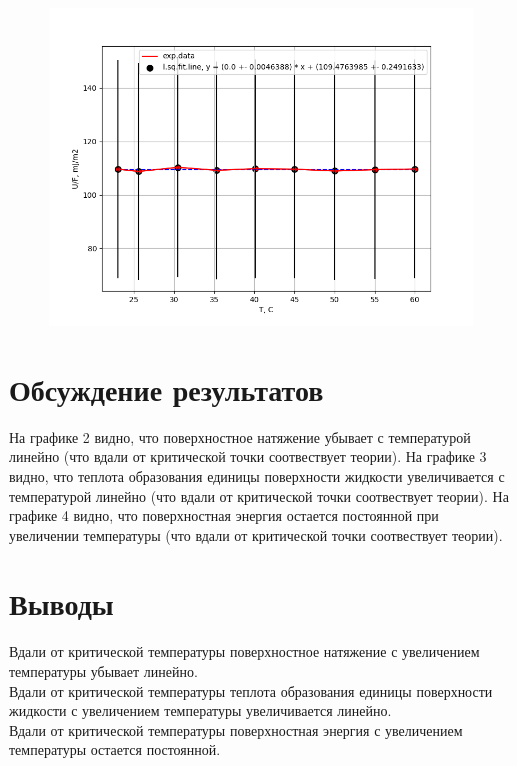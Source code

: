 \documentclass[a4paper,12pt]{article} %
\begin{document}
\begin{figure}[h!]
\begin{floatrow}
         {\includegraphics[scale=0.65]{physlabwork_13week_dUFdT.png}}     
\end{floatrow}
\end{figure}

\section{Обсуждение результатов}
На графике 2 видно, что поверхностное натяжение убывает с температурой линейно (что вдали от критической точки соотвествует теории). На графике 3 видно, что теплота образования единицы поверхности жидкости увеличивается с температурой линейно (что вдали от критической точки соотвествует теории). На графике 4 видно, что поверхностная энергия остается постоянной при увеличении температуры (что вдали от критической точки соотвествует теории).
\section{Выводы}
Вдали от критической температуры поверхностное натяжение с увеличением температуры убывает линейно. \\

Вдали от критической температуры теплота образования единицы поверхности жидкости с увеличением температуры увеличивается линейно. \\

Вдали от критической температуры поверхностная энергия с увеличением температуры остается постоянной.
\end{document}
